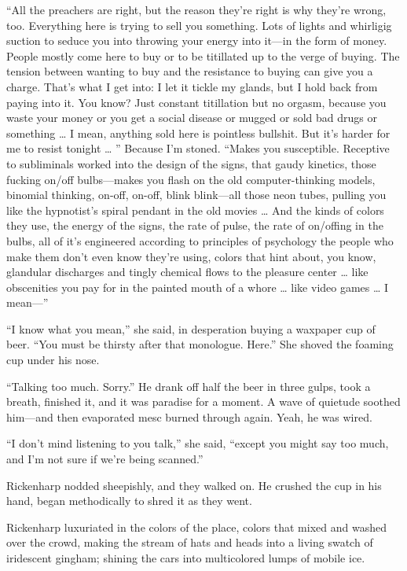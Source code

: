“All the preachers are right, but the reason they’re right is why they’re wrong, too. Everything here is trying to sell you something. Lots of lights and whirligig suction to seduce you into throwing your energy into it—in the form of money. People mostly come here to buy or to be titillated up to the verge of buying. The tension between wanting to buy and the resistance to buying can give you a charge. That’s what I get into: I let it tickle my glands, but I hold back from paying into it. You know? Just constant titillation but no orgasm, because you waste your money or you get a social disease or mugged or sold bad drugs or something … I mean, anything sold here is pointless bullshit. But it’s harder for me to resist tonight … ” Because I’m stoned. “Makes you susceptible. Receptive to subliminals worked into the design of the signs, that gaudy kinetics, those fucking on/off bulbs—makes you flash on the old computer-thinking models, binomial thinking, on-off, on-off, blink blink—all those neon tubes, pulling you like the hypnotist’s spiral pendant in the old movies … And the kinds of colors they use, the energy of the signs, the rate of pulse, the rate of on/offing in the bulbs, all of it’s engineered according to principles of psychology the people who make them don’t even know they’re using, colors that hint about, you know, glandular discharges and tingly chemical flows to the pleasure center … like obscenities you pay for in the painted mouth of a whore … like video games … I mean—”

“I know what you mean,” she said, in desperation buying a waxpaper cup of beer. “You must be thirsty after that monologue. Here.” She shoved the foaming cup under his nose.

“Talking too much. Sorry.” He drank off half the beer in three gulps, took a breath, finished it, and it was paradise for a moment. A wave of quietude soothed him—and then evaporated mesc burned through again. Yeah, he was wired.

“I don’t mind listening to you talk,” she said, “except you might say too much, and I’m not sure if we’re being scanned.”

Rickenharp nodded sheepishly, and they walked on. He crushed the cup in his hand, began methodically to shred it as they went.

Rickenharp luxuriated in the colors of the place, colors that mixed and washed over the crowd, making the stream of hats and heads into a living swatch of iridescent gingham; shining the cars into multicolored lumps of mobile ice.

